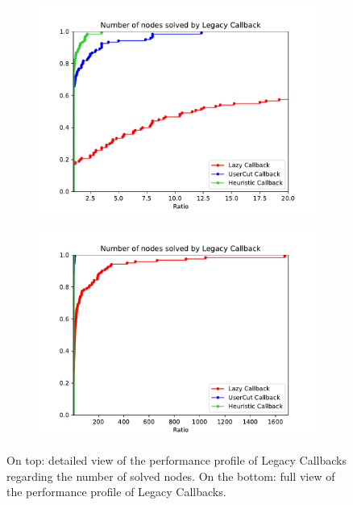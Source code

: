 \begin{figure}[h!]
  \centering
  \begin{subfigure}[b]{0.97\linewidth}
    \includegraphics[width=\linewidth]{media/NodesLegacy.pdf}
  \end{subfigure}
  \begin{subfigure}[b]{0.97\linewidth}
  \ContinuedFloat
    \includegraphics[width=\linewidth]{media/NodesLegacy1.pdf}
  \end{subfigure}
  \caption{On top: detailed view of the performance profile of Legacy Callbacks regarding the number of solved nodes. On the bottom: full view of the performance profile of Legacy Callbacks.}
  \label{fig:lazynodes}
\end{figure}

